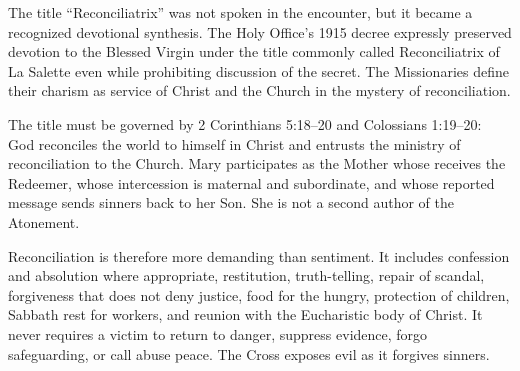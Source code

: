 The title ``Reconciliatrix'' was not spoken in the encounter, but it became a recognized devotional synthesis. The Holy Office's 1915 decree expressly preserved devotion to the Blessed Virgin under the title commonly called Reconciliatrix of La Salette even while prohibiting discussion of the secret. The Missionaries define their charism as service of Christ and the Church in the mystery of reconciliation.

The title must be governed by 2 Corinthians 5:18--20 and Colossians 1:19--20: God reconciles the world to himself in Christ and entrusts the ministry of reconciliation to the Church. Mary participates as the Mother whose  receives the Redeemer, whose intercession is maternal and subordinate, and whose reported message sends sinners back to her Son. She is not a second author of the Atonement.

Reconciliation is therefore more demanding than sentiment. It includes confession and absolution where appropriate, restitution, truth-telling, repair of scandal, forgiveness that does not deny justice, food for the hungry, protection of children, Sabbath rest for workers, and reunion with the Eucharistic body of Christ. It never requires a victim to return to danger, suppress evidence, forgo safeguarding, or call abuse peace. The Cross exposes evil as it forgives sinners.

